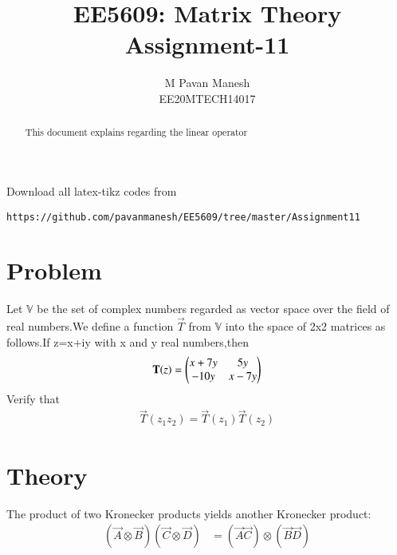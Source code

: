 \documentclass[journal,12pt,twocolumn]{IEEEtran}
\begin{document}
     \def\rightbox#1{\makebox[0in][r]{#1}}
     \def\centbox#1{\makebox[0in]{#1}}
     \def\topbox#1{\raisebox{-\baselineskip}[0in][0in]{#1}}
     \def\midbox#1{\raisebox{-0.5\baselineskip}[0in][0in]{#1}}
\vspace{3cm}
\title{EE5609: Matrix Theory\\
          Assignment-11\\}
\author{M Pavan Manesh\\
EE20MTECH14017 }
\maketitle
\newpage
\bigskip
\renewcommand{\thefigure}{\theenumi}
\renewcommand{\thetable}{\theenumi}
\begin{abstract}
This document explains regarding the linear operator
\end{abstract}
Download all latex-tikz codes from 
%
\begin{lstlisting}
https://github.com/pavanmanesh/EE5609/tree/master/Assignment11
\end{lstlisting}
%
\section{Problem}
Let $\mathbb{V}$ be the set of complex numbers regarded as vector space over the field of real numbers.We define a function $\vec{T}$ from $\mathbb{V}$ into the space of 2x2 matrices as follows.If z=x+iy with x and y real numbers,then 
\begin{align}
    \mathbf{T}(z)=\begin{pmatrix}x+7y&5y\\-10y&x-7y\end{pmatrix}\label{eq:1}
\end{align}
Verify that
\begin{align}
    \vec{T}(z_1z_2)=\vec{T}(z_1)\vec{T}(z_2) \label{eq:1}
\end{align}
\section{Theory}
The product of two Kronecker products yields another Kronecker product:
\begin{align}
    (\vec{A} \otimes\vec{B}) (\vec{C} \otimes\vec{D})&=
    (\vec{A} \vec{C})\otimes (\vec{B} \vec{D}) \label{eq:eq_th}
\end{align}
\end{document}
